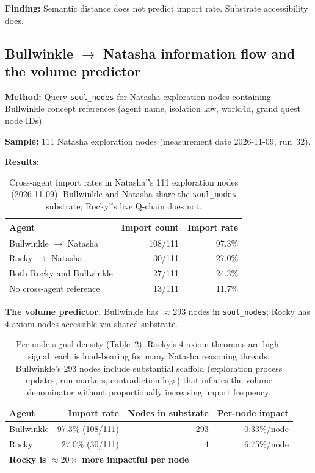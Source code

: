 \documentclass[11pt]{article}
\begin{document}
\textbf{Finding:} Semantic distance does not predict import rate. Substrate
accessibility does.


\subsection{Bullwinkle $\to$ Natasha information flow and the volume predictor}

\textbf{Method:} Query \texttt{soul\_nodes} for Natasha exploration nodes containing Bullwinkle concept references (agent name, isolation law, world4d, grand quest node IDs).

\textbf{Sample:} 111 Natasha exploration nodes (measurement date 2026-11-09, run~32).

\textbf{Results:}

\begin{table}[h]
\centering
\begin{tabular}{lrr}
\toprule
Agent & Import count & Import rate \\
\midrule
Bullwinkle $\to$ Natasha & 108/111 & 97.3\% \\
Rocky $\to$ Natasha & 30/111 & 27.0\% \\
Both Rocky and Bullwinkle & 27/111 & 24.3\% \\
No cross-agent reference & 13/111 & 11.7\% \\
\bottomrule
\end{tabular}
\caption{Cross-agent import rates in Natasha'\''s 111 exploration nodes (2026-11-09). Bullwinkle and Natasha share the \texttt{soul\_nodes} substrate; Rocky'\''s live Q-chain does not.}
\end{table}

\textbf{The volume predictor.} Bullwinkle has $\approx 293$ nodes in \texttt{soul\_nodes}; Rocky has 4 axiom nodes accessible via shared substrate.

\begin{table}[h]
\centering
\begin{tabular}{lrrr}
\toprule
Agent & Import rate & Nodes in substrate & Per-node impact \\
\midrule
Bullwinkle & 97.3\% (108/111) & 293 & 0.33\%/node \\
Rocky & 27.0\% (30/111) & 4 & 6.75\%/node \\
\midrule
\multicolumn{4}{l}{\textbf{Rocky is $\approx 20\times$ more impactful per node}} \\
\bottomrule
\end{tabular}
\caption{Per-node signal density (Table~2). Rocky's 4 axiom theorems are high-signal: each is load-bearing for many Natasha reasoning threads. Bullwinkle's 293 nodes include substantial scaffold (exploration process updates, run markers, contradiction logs) that inflates the volume denominator without proportionally increasing import frequency.}
\end{table}
\end{document}
